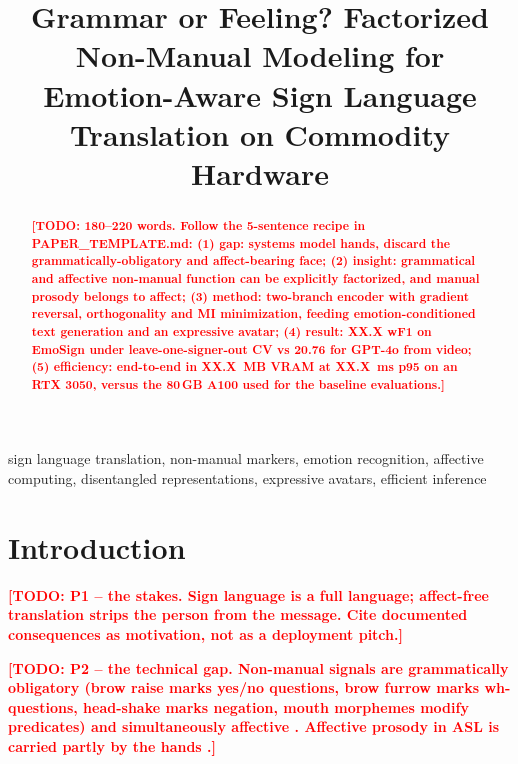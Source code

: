 \documentclass[conference]{IEEEtran}
\newcommand{\TODO}[1]{\textcolor{red}{\textbf{[TODO: #1]}}}
\newcommand{\NUM}{\textcolor{red}{XX.X}}
\begin{document}
\title{Grammar or Feeling? Factorized Non-Manual Modeling for\\
Emotion-Aware Sign Language Translation on Commodity Hardware}

\author{
}

\maketitle

\begin{abstract}
\TODO{180--220 words. Follow the 5-sentence recipe in PAPER\_TEMPLATE.md:
(1) gap: systems model hands, discard the grammatically-obligatory and affect-bearing face;
(2) insight: grammatical and affective non-manual function can be explicitly factorized, and
manual prosody belongs to affect;
(3) method: two-branch encoder with gradient reversal, orthogonality and MI minimization, feeding
emotion-conditioned text generation and an expressive avatar;
(4) result: \NUM{} wF1 on EmoSign under leave-one-signer-out CV vs 20.76 for GPT-4o from video;
(5) efficiency: end-to-end in \NUM{}~MB VRAM at \NUM{}~ms p95 on an RTX 3050, versus the 80\,GB
A100 used for the baseline evaluations.}
\end{abstract}

\begin{IEEEkeywords}
sign language translation, non-manual markers, emotion recognition, affective computing,
disentangled representations, expressive avatars, efficient inference
\end{IEEEkeywords}

\section{Introduction}
\label{sec:intro}

\TODO{P1 -- the stakes. Sign language is a full language; affect-free translation strips the person
from the message. Cite documented consequences as motivation, not as a deployment pitch.}

\TODO{P2 -- the technical gap. Non-manual signals are grammatically obligatory (brow raise marks
yes/no questions, brow furrow marks wh-questions, head-shake marks negation, mouth morphemes modify
predicates) \cite{valli2000linguistics,pfau2012signlanguage} and simultaneously affective
\cite{elliott2013facial}. Affective prosody in ASL is carried partly by the hands
\cite{reilly1992affective,hietanen2004perception}.}
\end{document}
